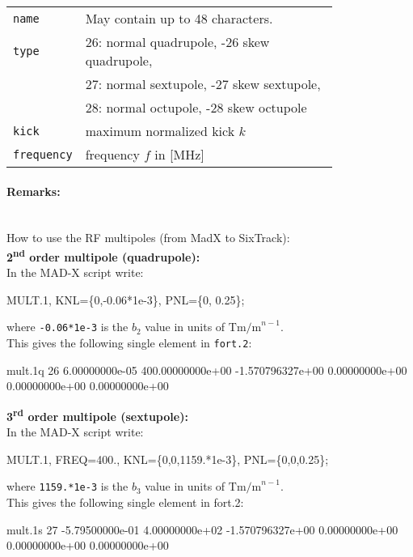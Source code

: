 \bigskip
\begin{tabular}{@{}lp{0.8\linewidth}}
    \texttt{name} & May contain up to 48 characters. \\
    \texttt{type} & 26: normal quadrupole, -26 skew quadrupole, \\
                  & 27: normal sextupole, -27 skew sextupole, \\
                  & 28: normal octupole, -28 skew octupole \\
    \texttt{kick} & maximum normalized kick $k$ \\
    \texttt{frequency} & frequency $f$ in [MHz]
\end{tabular}

\paragraph{Remarks:}~\\
How to use the RF multipoles (from MadX to SixTrack):\\

\noindent\textbf{2\textsuperscript{nd} order multipole (quadrupole):}\\
\noindent In the MAD-X script write:
\begin{cverbatim}
MULT.1, KNL=\{0,-0.06*1e-3\}, PNL=\{0, 0.25\};
\end{cverbatim}
where \texttt{-0.06*1e-3} is the $b_2$ value in units of $\mathrm{Tm/m}^{n-1}$.\\
This gives the following single element in \texttt{fort.2}:
\begin{cverbatim}
mult.1q  26  6.00000000e-05  400.00000000e+00  -1.570796327e+00  0.00000000e+00  0.00000000e+00  0.00000000e+00
\end{cverbatim}

\noindent\textbf{3\textsuperscript{rd} order multipole (sextupole):}\\
\noindent In the MAD-X script write:
\begin{cverbatim}
MULT.1, FREQ=400., KNL=\{0,0,1159.*1e-3\}, PNL=\{0,0,0.25\};
\end{cverbatim}
where \texttt{1159.*1e-3} is the $b_3$ value in units of $\mathrm{Tm/m}^{n-1}$.\\
This gives the following single element in fort.2:
\begin{cverbatim}
mult.1s  27 -5.79500000e-01  4.00000000e+02  -1.570796327e+00  0.00000000e+00  0.00000000e+00  0.00000000e+00
\end{cverbatim}

